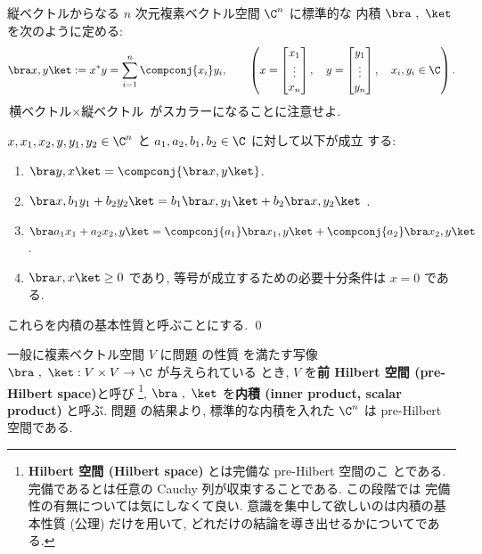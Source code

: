 \documentclass[12pt,twoside]{jarticle}
\begin{document}

縦ベクトルからなる $n$ 次元複素ベクトル空間 $\C^n$ に標準的な
内積 $\bra\ ,\ \ket$ を次のように定める:
\begin{equation*}
  \bra x, y \ket := x^* y = \sum_{i=1}^n \compconj{x_i}y_i,
  \qquad
  \left(
  x =
  \begin{bmatrix}
    x_1 \\ \vdots \\ x_n
  \end{bmatrix},
  \quad
  y =
  \begin{bmatrix}
    y_1 \\ \vdots \\ y_n
  \end{bmatrix},
  \quad
  x_i, y_i\in\C
  \right).
\end{equation*}
$\text{横ベクトル}\times\text{縦ベクトル}$ がスカラーになることに注意せよ.


\begin{question}[内積の基本性質]
\label{q:inner-prod-axioms}
  $x,x_1,x_2,y,y_1,y_2\in\C^n$ と $a_1,a_2,b_1,b_2\in\C$ に対して以下が成立
  する: 
  \begin{enumerate}
  \item $\bra y, x\ket = \compconj{\bra x, y\ket}$.
  \item $\bra x, b_1y_1+b_2y_2\ket
    = b_1\bra x, y_1\ket + b_2\bra x, y_2\ket$
    .
  \item $\bra a_1x_1+a_2x_2, y\ket
    = \compconj{a_1}\bra x_1, y\ket + \compconj{a_2}\bra x_2, y\ket$
    .
  \item $\bra x, x\ket \ge 0$ であり,
    等号が成立するための必要十分条件は $x=0$ である. 
  \end{enumerate}
  これらを内積の基本性質と呼ぶことにする. 
  \qed
\end{question}


一般に複素ベクトル空間 $V$ に問題  の性質
を満たす写像 $\bra\ ,\ \ket:V\times V\to\C$ が与えられている
とき, $V$ を{\bf 前 Hilbert 空間 (pre-Hilbert space)}と呼び%
\footnote{{\bf Hilbert 空間 (Hilbert space)} とは完備な pre-Hilbert 空間のこ
  とである. 完備であるとは任意の Cauchy 列が収束することである. この段階では
  完備性の有無については気にしなくて良い.  意識を集中して欲しいのは内積の基
  本性質 (公理) だけを用いて, どれだけの結論を導き出せるかについてである.}, %
$\bra\ ,\ \ket$ を{\bf 内積 (inner product, scalar product)} と呼ぶ.
問題  の結果より, 
標準的な内積を入れた $\C^n$ は pre-Hilbert 空間である.
\end{document}
